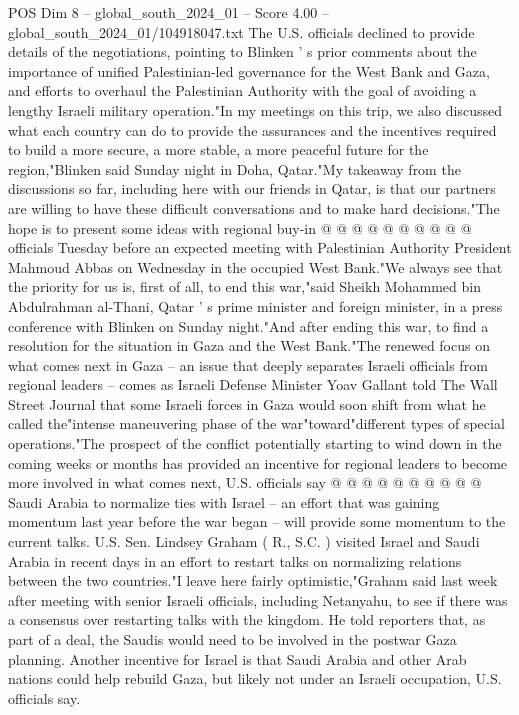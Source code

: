 \begin{textsample}{POS Dim 8 – global\_south\_2024\_01 – Score 4.00 – global\_south\_2024\_01/104918047.txt}
The U.S. officials declined to provide details of the negotiations, pointing to Blinken ' s prior comments about the importance of unified Palestinian-led governance for the West Bank and Gaza, and efforts to overhaul the Palestinian Authority with the goal of avoiding a lengthy Israeli military operation."In my meetings on this trip, we also discussed what each country can do to provide the assurances and the incentives required to build a more secure, a more stable, a more peaceful future for the region,"Blinken said Sunday night in Doha, Qatar."My takeaway from the discussions so far, including here with our friends in Qatar, is that our partners are willing to have these difficult conversations and to make hard decisions."The hope is to present some ideas with regional buy-in @ @ @ @ @ @ @ @ @ @ officials Tuesday before an expected meeting with Palestinian Authority President Mahmoud Abbas on Wednesday in the occupied West Bank."We always see that the priority for us is, first of all, to end this war,"said Sheikh Mohammed bin Abdulrahman al-Thani, Qatar ' s prime minister and foreign minister, in a press conference with Blinken on Sunday night."And after ending this war, to find a resolution for the situation in Gaza and the West Bank."The renewed focus on what comes next in Gaza -- an issue that deeply separates Israeli officials from regional leaders -- comes as Israeli Defense Minister Yoav Gallant told The Wall Street Journal that some Israeli forces in Gaza would soon shift from what he called the"intense maneuvering phase of the war"toward"different types of special operations."The prospect of the conflict potentially starting to wind down in the coming weeks or months has provided an incentive for regional leaders to become more involved in what comes next, U.S. officials say @ @ @ @ @ @ @ @ @ @ Saudi Arabia to normalize ties with Israel -- an effort that was gaining momentum last year before the war began -- will provide some momentum to the current talks.
U.S.
Sen.
Lindsey Graham ( R., S.C. ) visited Israel and Saudi Arabia in recent days in an effort to restart talks on normalizing relations between the two countries."I leave here fairly optimistic,"Graham said last week after meeting with senior Israeli officials, including Netanyahu, to see if there was a consensus over restarting talks with the kingdom.
He told reporters that, as part of a deal, the Saudis would need to be involved in the postwar Gaza planning.
Another incentive for Israel is that Saudi Arabia and other Arab nations could help rebuild Gaza, but likely not under an Israeli occupation, U.S. officials say.

\end{textsample}
